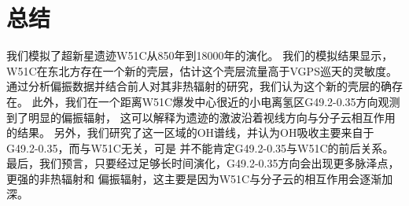 \section{总结}
\label{W51Csum}
我们模拟了超新星遗迹W51C从850年到18000年的演化。
我们的模拟结果显示，W51C在东北方存在一个新的壳层，估计这个壳层流量高于VGPS巡天的灵敏度。
通过分析偏振数据并结合前人对其非热辐射的研究，我们认为这个新的壳层的确存在。
此外，我们在一个距离W51C爆发中心很近的小电离氢区G49.2-0.35方向观测到了明显的偏振辐射，
这可以解释为遗迹的激波沿着视线方向与分子云相互作用的结果。
另外，我们研究了这一区域的OH谱线，并认为OH吸收主要来自于G49.2-0.35，而与W51C无关，可是
并不能肯定G49.2-0.35与W51C的前后关系。
最后，我们预言，只要经过足够长时间演化，G49.2-0.35方向会出现更多脉泽点，更强的非热辐射和
偏振辐射，这主要是因为W51C与分子云的相互作用会逐渐加深。
